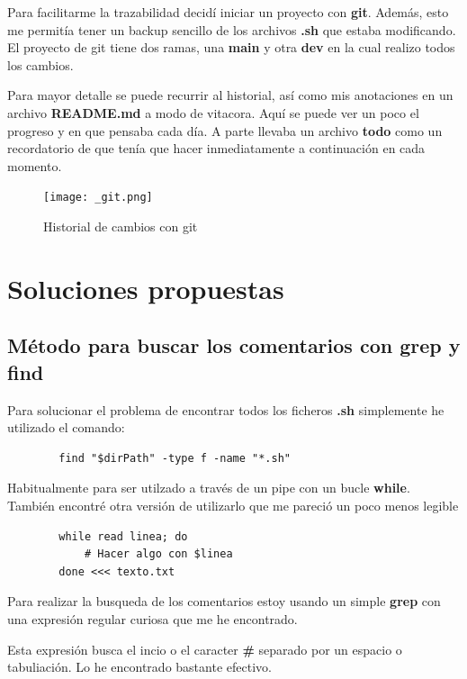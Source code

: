 \documentclass{article}
\begin{document}
        Para facilitarme la trazabilidad decidí iniciar un proyecto con \textbf{git}. Además, esto me permitía tener un backup sencillo de los archivos \textbf{.sh} que estaba modificando. El proyecto de git tiene dos ramas, una \textbf{main} y otra \textbf{dev} en la cual realizo todos los cambios.

        Para mayor detalle se puede recurrir al historial, así como mis anotaciones en un archivo \textbf{README.md} a modo de vitacora. Aquí se puede ver un poco el progreso y en que pensaba cada día. A parte llevaba un archivo \textbf{todo} como un recordatorio de que tenía que hacer inmediatamente a continuación en cada momento.


        \begin{figure}
            \centering
            \texttt{[image: \_git.png]}
            \caption{Historial de cambios con git}
        \end{figure}
        

\newpage
\section{Soluciones propuestas}
    \subsection{Método para buscar los comentarios con grep y find}
        Para solucionar el problema de encontrar todos los ficheros \textbf{.sh} simplemente he utilizado el comando:

        \begin{verbatim}
        find "$dirPath" -type f -name "*.sh" 
        \end{verbatim}

    Habitualmente para ser utilzado a través de un pipe con un bucle \textbf{while}. También encontré otra versión de utilizarlo que me pareció un poco menos legible

        \begin{verbatim}
        while read linea; do
            # Hacer algo con $linea
        done <<< texto.txt
        \end{verbatim}

    Para realizar la busqueda de los comentarios estoy usando un simple \textbf{grep} con una expresión regular curiosa que me he encontrado.

    Esta expresión busca el incio o el caracter \textbf{\#} separado por un espacio o tabuliación. Lo he encontrado bastante efectivo.
\end{document}
